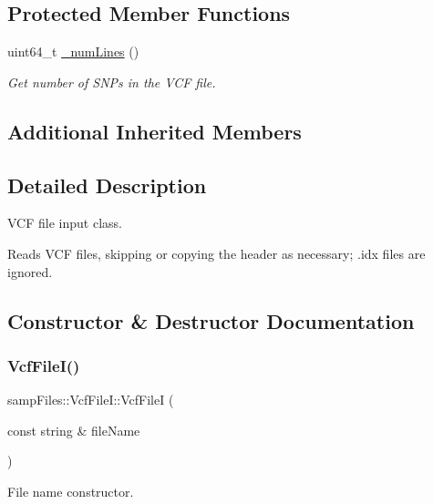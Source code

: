 \subsection*{Protected Member Functions}
\begin{DoxyCompactItemize}
\item 
uint64\+\_\+t \hyperlink{classsamp_files_1_1_vcf_file_i_a02f2494cc78e8d83733a2bb0c9a84602}{\+\_\+num\+Lines} ()
\begin{DoxyCompactList}\small\item\em Get number of S\+N\+Ps in the V\+CF file. \end{DoxyCompactList}\end{DoxyCompactItemize}
\subsection*{Additional Inherited Members}


\subsection{Detailed Description}
V\+CF file input class. 

Reads V\+CF files, skipping or copying the header as necessary; .idx files are ignored. 

\subsection{Constructor \& Destructor Documentation}
\mbox{\label{classsamp_files_1_1_vcf_file_i_a7d293b4303a5b293f8a3c27e4cc12f48}} 
\subsubsection{\texorpdfstring{Vcf\+File\+I()}{VcfFileI()}}
{\footnotesize\ttfamily samp\+Files\+::\+Vcf\+File\+I\+::\+Vcf\+FileI (\begin{DoxyParamCaption}\item[{const string \&}]{file\+Name }\end{DoxyParamCaption})\hspace{0.3cm}{\ttfamily [inline]}}



File name constructor. 


